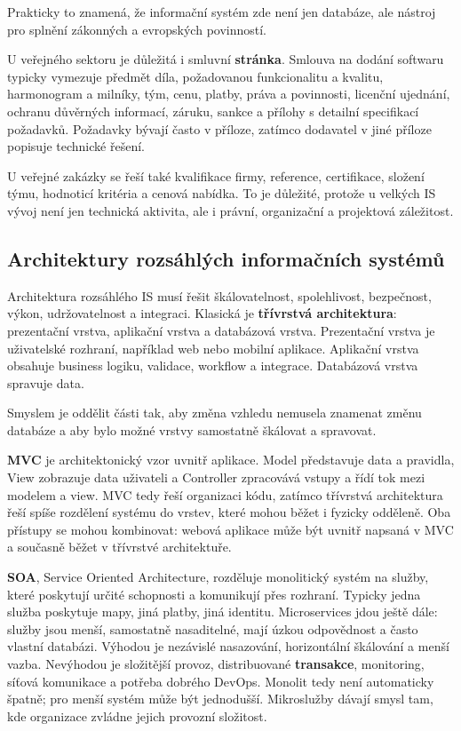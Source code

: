 \documentclass[11pt,a4paper]{article}
\begin{document}
Prakticky to znamená, že informační systém zde není jen databáze, ale nástroj pro splnění zákonných a evropských povinností.

U veřejného sektoru je důležitá i smluvní \textbf{stránka}. Smlouva na dodání softwaru typicky vymezuje předmět díla, požadovanou funkcionalitu a kvalitu, harmonogram a milníky, tým, cenu, platby, práva a povinnosti, licenční ujednání, ochranu důvěrných informací, záruku, sankce a přílohy s detailní specifikací požadavků. Požadavky bývají často v příloze, zatímco dodavatel v jiné příloze popisuje technické řešení.

U veřejné zakázky se řeší také kvalifikace firmy, reference, certifikace, složení týmu, hodnoticí kritéria a cenová nabídka. To je důležité, protože u velkých IS vývoj není jen technická aktivita, ale i právní, organizační a projektová záležitost.

\subsection*{Architektury rozsáhlých informačních systémů}

Architektura rozsáhlého IS musí řešit škálovatelnost, spolehlivost, bezpečnost, výkon, udržovatelnost a integraci. Klasická je \textbf{třívrstvá architektura}: prezentační vrstva, aplikační vrstva a databázová vrstva. Prezentační vrstva je uživatelské rozhraní, například web nebo mobilní aplikace. Aplikační vrstva obsahuje business logiku, validace, workflow a integrace. Databázová vrstva spravuje data.

Smyslem je oddělit části tak, aby změna vzhledu nemusela znamenat změnu databáze a aby bylo možné vrstvy samostatně škálovat a spravovat.

\textbf{MVC} je architektonický vzor uvnitř aplikace. Model představuje data a pravidla, View zobrazuje data uživateli a Controller zpracovává vstupy a řídí tok mezi modelem a view. MVC tedy řeší organizaci kódu, zatímco třívrstvá architektura řeší spíše rozdělení systému do vrstev, které mohou běžet i fyzicky odděleně. Oba přístupy se mohou kombinovat: webová aplikace může být uvnitř napsaná v MVC a současně běžet v třívrstvé architektuře.

\textbf{SOA}, Service Oriented Architecture, rozděluje monolitický systém na služby, které poskytují určité schopnosti a komunikují přes rozhraní. Typicky jedna služba poskytuje mapy, jiná platby, jiná identitu. Microservices jdou ještě dále: služby jsou menší, samostatně nasaditelné, mají úzkou odpovědnost a často vlastní databázi. Výhodou je nezávislé nasazování, horizontální škálování a menší vazba. Nevýhodou je složitější provoz, distribuované \textbf{transakce}, monitoring, síťová komunikace a potřeba dobrého DevOps. Monolit tedy není automaticky špatně; pro menší systém může být jednodušší. Mikroslužby dávají smysl tam, kde organizace zvládne jejich provozní složitost.
\end{document}
